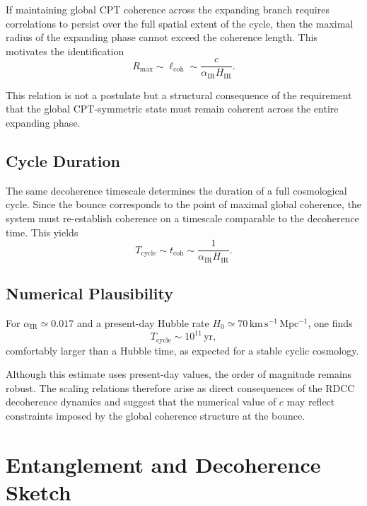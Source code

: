\documentclass[11pt,a4paper]{article}
\begin{document}
If maintaining global CPT coherence across the expanding branch requires correlations to
persist over the full spatial extent of the cycle, then the maximal radius of the expanding
phase cannot exceed the coherence length. This motivates the identification
\begin{equation}
    R_{\mathrm{max}} \sim \ell_{\mathrm{coh}}
    \sim \frac{c}{\alpha_{\mathrm{IR}} H_{\mathrm{IR}}}.
\end{equation}

This relation is not a postulate but a structural consequence of the requirement that the
global CPT-symmetric state must remain coherent across the entire expanding phase.

\subsection{Cycle Duration}

The same decoherence timescale determines the duration of a full cosmological cycle. Since
the bounce corresponds to the point of maximal global coherence, the system must re-establish
coherence on a timescale comparable to the decoherence time. This yields
\begin{equation}
    T_{\mathrm{cycle}}
    \sim t_{\mathrm{coh}}
    \sim \frac{1}{\alpha_{\mathrm{IR}} H_{\mathrm{IR}}}.
\end{equation}

\subsection{Numerical Plausibility}

For $\alpha_{\mathrm{IR}} \simeq 0.017$ and a present-day Hubble rate
$H_{0} \simeq 70\,\mathrm{km\,s^{-1}\,Mpc^{-1}}$, one finds
\begin{equation}
    T_{\mathrm{cycle}} \sim 10^{11}\,\mathrm{yr},
\end{equation}
comfortably larger than a Hubble time, as expected for a stable cyclic cosmology.

Although this estimate uses present-day values, the order of magnitude remains robust.
The scaling relations therefore arise as direct consequences of the RDCC decoherence
dynamics and suggest that the numerical value of $c$ may reflect constraints imposed by
the global coherence structure at the bounce.

\section{Entanglement and Decoherence Sketch}
\end{document}
